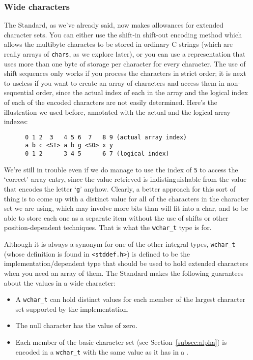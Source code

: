    

   \subsubsection{Wide characters}
    

    The Standard, as we've already said, now makes allowances for extended
     character sets. You can either use the shift-in shift-out encoding method
     which allows the multibyte charactes to be stored in ordinary C strings
     (which are really arrays of \texttt{chars}, as we explore later), or
     you can use a representation that uses more than one byte of storage per
     character for every character. The use of shift sequences only works if
     you process the characters in strict order; it is next to useless if you
     want to create an array of characters and access them in non-sequential
     order, since the actual index of each \kchar{} in the array and
     the logical index of each of the encoded characters are not easily
     determined. Here's the illustration we used before, annotated with the
     actual and the logical array indexes:


    \begin{Verbatim}
      0 1 2  3   4 5 6  7   8 9 (actual array index)
      a b c <SI> a b g <SO> x y
      0 1 2      3 4 5      6 7 (logical index)
    \end{Verbatim}

    We're still in trouble even if we do manage to use the index
     of \texttt{5} to access the `correct' array entry, since
     the value retrieved is indistinguishable from the value that encodes the
     letter `\texttt{g}' anyhow. Clearly, a better approach for
     this sort of thing is to come up with a distinct value for all of the
     characters in the character set we are using, which may involve more bits
     than will fit into a char, and to be able to store each one as a separate
     item without the use of shifts or other position-dependent techniques.
     That is what the \texttt{wchar\_t} type is for.


     Although it is always a synonym for one of the other integral types,
     \texttt{wchar\_t} (whose definition is found in
     \texttt{<stddef.h>}) is defined to be the
     implementation\-/dependent type that should be used to hold extended
     characters when you need an array of them. The Standard makes the
     following guarantees about the values in a wide character:


    \begin{itemize}
     \item A \texttt{wchar\_t} can hold distinct values for each member of
      the largest character set supported by the implementation.

     \item The null character has the value of zero.

     \item Each member of the basic character set
       (see Section~\ref{subsec:alpha})
       is encoded in a \texttt{wchar\_t} with the same value
      as it has in a \kchar.
    \end{itemize}

